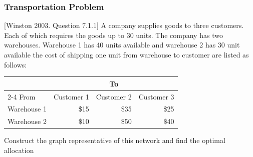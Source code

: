 \documentclass[10pt,handout,notes=show]{beamer}
\begin{document}
\begin{frame}
  \frametitle{Transportation Problem  }

  \small{ [Winston 2003. Question 7.1.1] A company supplies goods to three customers. Each of which requires the goods up to 30 units. The company has two warehouses. Warehouse 1 has 40 units available and warehouse 2 has 30 unit available the cost of shipping one unit from warehouse to customer are listed as follows:
  \begin{center}
  \begin{tabular}{lrrr} \hline
        ~ & \multicolumn{3}{c}{To} \\ \cline{2-4}
    From        & Customer 1  & Customer 2  & Customer 3 \\ \hline
    Warehouse 1 & \$15 & \$35 & \$25 \\
    Warehouse 2 & \$10 & \$50 & \$40 \\ \hline
  \end{tabular}
  \end{center}
  Construct the graph representative of this network and find the optimal allocation
  }

\end{frame}
\end{document}
